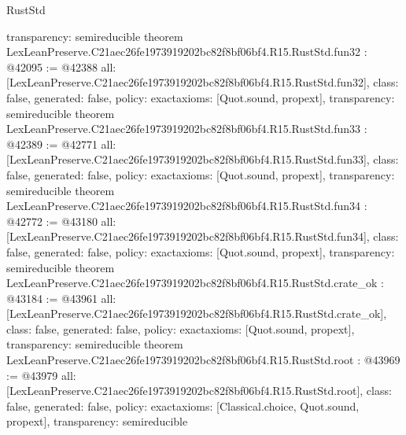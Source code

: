 \begin{lexlean}{RustStd}
\begin{coremodule}
{  transparency: semireducible
}
theorem LexLeanPreserve.C21aec26fe1973919202bc82f8bf06bf4.R15.RustStd.fun32 : @42095 := @42388 {
  all: [LexLeanPreserve.C21aec26fe1973919202bc82f8bf06bf4.R15.RustStd.fun32],
  class: false,
  generated: false,
  policy: exact{axioms: [Quot.sound, propext]},
  transparency: semireducible
}
theorem LexLeanPreserve.C21aec26fe1973919202bc82f8bf06bf4.R15.RustStd.fun33 : @42389 := @42771 {
  all: [LexLeanPreserve.C21aec26fe1973919202bc82f8bf06bf4.R15.RustStd.fun33],
  class: false,
  generated: false,
  policy: exact{axioms: [Quot.sound, propext]},
  transparency: semireducible
}
theorem LexLeanPreserve.C21aec26fe1973919202bc82f8bf06bf4.R15.RustStd.fun34 : @42772 := @43180 {
  all: [LexLeanPreserve.C21aec26fe1973919202bc82f8bf06bf4.R15.RustStd.fun34],
  class: false,
  generated: false,
  policy: exact{axioms: [Quot.sound, propext]},
  transparency: semireducible
}
theorem LexLeanPreserve.C21aec26fe1973919202bc82f8bf06bf4.R15.RustStd.crate_ok : @43184 := @43961 {
  all: [LexLeanPreserve.C21aec26fe1973919202bc82f8bf06bf4.R15.RustStd.crate_ok],
  class: false,
  generated: false,
  policy: exact{axioms: [Quot.sound, propext]},
  transparency: semireducible
}
theorem LexLeanPreserve.C21aec26fe1973919202bc82f8bf06bf4.R15.RustStd.root : @43969 := @43979 {
  all: [LexLeanPreserve.C21aec26fe1973919202bc82f8bf06bf4.R15.RustStd.root],
  class: false,
  generated: false,
  policy: exact{axioms: [Classical.choice, Quot.sound, propext]},
  transparency: semireducible
}


\end{coremodule}
\end{lexlean}
